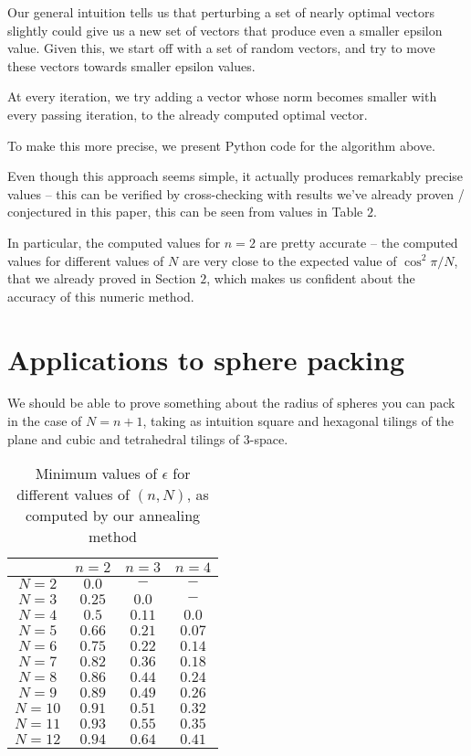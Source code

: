 \documentclass[11pt,letterpaper,twoside,english]{article}
\theoremstyle{theorem}
\theoremstyle{remark}
\begin{document}
Our general intuition tells us that perturbing a set of nearly optimal vectors slightly could give us a new set of vectors that produce even a smaller epsilon value. Given this, we start off with a set of random vectors, and try to move these vectors towards smaller epsilon values.

At every iteration, we try adding a vector whose norm becomes smaller with every passing iteration, to the already computed optimal vector.

To make this more precise, we present Python code for the algorithm above.

Even though this approach seems simple, it actually produces remarkably precise values -- this can be verified by cross-checking with results we've already proven / conjectured in this paper, this can be seen from values in Table $2$.

In particular, the computed values for $n=2$ are pretty accurate -- the computed values for different values of $N$ are very close to the expected value of $\cos^2 \pi/N$, that we already proved in Section $2$, which makes us confident about the accuracy of this numeric method.

\section{Applications to sphere packing}
We should be able to prove something about the radius of spheres you can pack in the case of $N=n+1$, taking as intuition square and hexagonal tilings of the plane and cubic and tetrahedral tilings of 3-space. 

\begin{table}
   \centering
    \begin{tabular}{ | c | c | c | c |}
    \hline
      & $n=2$ & $n=3$ & $n=4$ \\ \hline
    $N=2$ & $0.0$ & $-$ & $-$ \\ \hline
    $N=3$ & $0.25$ & $0.0$ & $-$ \\ \hline
    $N=4$ & $0.5$ & $0.11$ & $0.0$ \\ \hline
    $N=5$ & $0.66$ & $0.21$ & $0.07$ \\ \hline
    $N=6$ & $0.75$ & $0.22$ & $0.14$ \\ \hline
    $N=7$ & $0.82$ & $0.36$ & $0.18$ \\ \hline
    $N=8$ &  $0.86$ & $0.44$ & $0.24$ \\ \hline
    $N=9$ &  $0.89$ & $0.49$ & $0.26$ \\ \hline
    $N=10$ & $0.91$ & $0.51$ & $0.32$ \\ \hline
    $N=11$ & $0.93$  & $0.55$ & $0.35$ \\ \hline
    $N=12$ & $0.94$ & $0.64$ & $0.41$ \\
    \hline
    \end{tabular}
    \caption {Minimum values of $\epsilon$ for different values of $(n, N)$, as computed by our annealing method}
\end{table}
\end{document}
